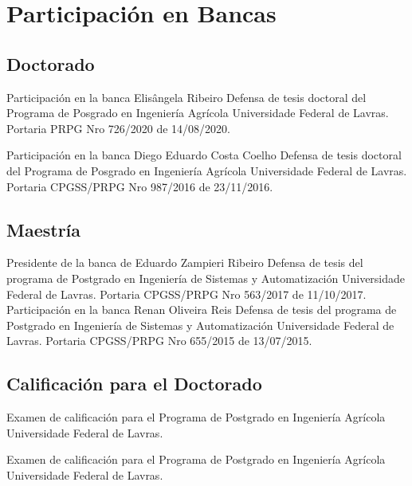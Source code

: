 \documentclass[11pt,a4paper,sans]{moderncv} %
\begin{document}
\section{Participación en Bancas}
\subsection{Doctorado}

			{Participación en la banca Elisângela Ribeiro}
			{Defensa de tesis doctoral del Programa de Posgrado en Ingeniería Agrícola}{}
			{Universidade Federal de Lavras. Portaria PRPG Nro 726/2020 de 14/08/2020.}


			{Participación en la banca Diego Eduardo Costa Coelho}
			{Defensa de tesis doctoral del Programa de Posgrado en Ingeniería Agrícola}{}
			{Universidade Federal de Lavras. Portaria CPGSS/PRPG Nro 987/2016 de 23/11/2016.}

\subsection{Maestría}
			{Presidente de la banca de Eduardo Zampieri Ribeiro}
			{Defensa de tesis del programa de Postgrado en Ingeniería de Sistemas y Automatización}{}
			{Universidade Federal de Lavras. Portaria CPGSS/PRPG Nro 563/2017 de 11/10/2017.}
			{Participación en la banca Renan Oliveira Reis}
			{Defensa de tesis del programa de Postgrado en Ingeniería de Sistemas y Automatización}{}
			{Universidade Federal de Lavras. Portaria CPGSS/PRPG Nro 655/2015 de 13/07/2015.}

\subsection{Calificación para el Doctorado}
			{}
			{Examen de calificación para el Programa de Postgrado en Ingeniería Agrícola}{}
			{Universidade Federal de Lavras.}

			{}
			{Examen de calificación para el Programa de Postgrado en Ingeniería Agrícola}{}
			{Universidade Federal de Lavras.}
\end{document}
